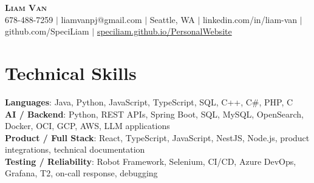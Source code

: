 \documentclass[letterpaper,11pt]{article}
\begin{document}

%
\begin{center}
    \textbf{\Huge \scshape Liam Van} \\ \vspace{1pt}
    \small 678-488-7259 $|$ \small {liamvanpj@gmail.com} $|$ Seattle, WA
 {{$|$ linkedin.com/in/liam-van} {$|$ github.com/SpeciLiam} {$|$ \href{https://speciliam.github.io/PersonalWebsite}{speciliam.github.io/PersonalWebsite}}}

\end{center}

\section{Technical Skills}
 \begin{itemize}[leftmargin=0.15in, label={}]
    \small{\item{
     \textbf{Languages}{: Java, Python, JavaScript, TypeScript, SQL, C++, C\#, PHP, C} \\
     \textbf{AI / Backend}{: Python, REST APIs, Spring Boot, SQL, MySQL, OpenSearch, Docker, OCI, GCP, AWS, LLM applications} \\
     \textbf{Product / Full Stack}{: React, TypeScript, JavaScript, NestJS, Node.js, product integrations, technical documentation} \\
     \textbf{Testing / Reliability}{: Robot Framework, Selenium, CI/CD, Azure DevOps, Grafana, T2, on-call response, debugging} \\
    }}
 \end{itemize}
%
\end{document}
